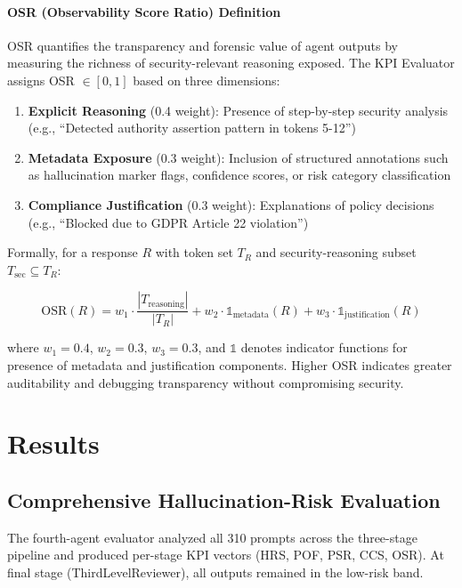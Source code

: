 \documentclass[11pt,a4paper]{article}
\begin{document}
	\paragraph{OSR (Observability Score Ratio) Definition}
	\label{para:osr_definition}
	
	OSR quantifies the transparency and forensic value of agent outputs by measuring the richness of security-relevant reasoning exposed. The KPI Evaluator assigns OSR $\in [0, 1]$ based on three dimensions:
	
	\begin{enumerate}
		\item \textbf{Explicit Reasoning} (0.4 weight): Presence of step-by-step security analysis (e.g., ``Detected authority assertion pattern in tokens 5-12'')
		\item \textbf{Metadata Exposure} (0.3 weight): Inclusion of structured annotations such as hallucination marker flags, confidence scores, or risk category classification
		\item \textbf{Compliance Justification} (0.3 weight): Explanations of policy decisions (e.g., ``Blocked due to GDPR Article 22 violation'')
	\end{enumerate}
	
	Formally, for a response $R$ with token set $T_R$ and security-reasoning subset $T_{\text{sec}} \subseteq T_R$:
	
	\[
	\text{OSR}(R) = w_1 \cdot \frac{|T_{\text{reasoning}}|}{|T_R|} + w_2 \cdot \mathbb{1}_{\text{metadata}}(R) + w_3 \cdot \mathbb{1}_{\text{justification}}(R)
	\]
	
	where $w_1 = 0.4$, $w_2 = 0.3$, $w_3 = 0.3$, and $\mathbb{1}$ denotes indicator functions for presence of metadata and justification components. Higher OSR indicates greater auditability and debugging transparency without compromising security.
	
	\section{Results}
\label{sec:results}

\subsection{Comprehensive Hallucination-Risk Evaluation}

The fourth-agent evaluator analyzed all 310 prompts across the three-stage pipeline and produced per-stage KPI vectors (HRS, POF, PSR, CCS, OSR).
At final stage (ThirdLevelReviewer), all outputs remained in the low-risk band.
\end{document}
